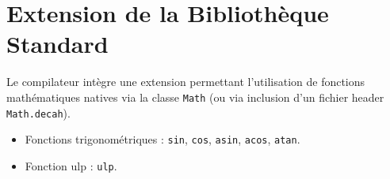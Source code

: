 \section{Extension de la Bibliothèque Standard}
\noindent
Le compilateur intègre une extension permettant l'utilisation de fonctions mathématiques natives via la classe \texttt{Math} (ou via inclusion d'un fichier header \texttt{Math.decah}).

\begin{itemize}[label=$\circ$]
    \item Fonctions trigonométriques : \texttt{sin}, \texttt{cos}, \texttt{asin}, \texttt{acos}, \texttt{atan}.
    \item Fonction ulp : \texttt{ulp}.
\end{itemize}
